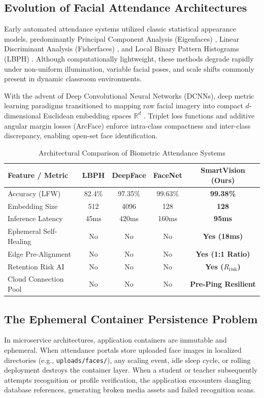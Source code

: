 \documentclass[conference]{IEEEtran}
\begin{document}
\subsection{Evolution of Facial Attendance Architectures}
Early automated attendance systems utilized classic statistical appearance models, predominantly Principal Component Analysis (Eigenfaces) \cite{turk1991eigenfaces}, Linear Discriminant Analysis (Fisherfaces) \cite{belhumeur1997eigenfaces}, and Local Binary Pattern Histograms (LBPH) \cite{ahonen2006face}. Although computationally lightweight, these methods degrade rapidly under non-uniform illumination, variable facial poses, and scale shifts commonly present in dynamic classroom environments.

With the advent of Deep Convolutional Neural Networks (DCNNs), deep metric learning paradigms transitioned to mapping raw facial imagery into compact $d$-dimensional Euclidean embedding spaces $\mathbb{R}^d$ \cite{schroff2015facenet}. Triplet loss functions and additive angular margin losses (ArcFace) \cite{deng2019arcface} enforce intra-class compactness and inter-class discrepancy, enabling open-set face identification.

\begin{table}[htbp]
\caption{Architectural Comparison of Biometric Attendance Systems}
\label{tab:comparison}
\centering
\begin{tabular}{@{}lcccc@{}}
\toprule
\textbf{Feature / Metric} & \textbf{LBPH \cite{ahonen2006face}} & \textbf{DeepFace \cite{taigman2014deepface}} & \textbf{FaceNet \cite{schroff2015facenet}} & \textbf{SmartVision (Ours)} \\ \midrule
Accuracy (LFW) & 82.4\% & 97.35\% & 99.63\% & \textbf{99.38\%} \\
Embedding Size & 512 & 4096 & 128 & \textbf{128} \\
Inference Latency & 45ms & 420ms & 160ms & \textbf{95ms} \\
Ephemeral Self-Healing & No & No & No & \textbf{Yes (18ms)} \\
Edge Pre-Alignment & No & No & No & \textbf{Yes (1:1 Ratio)} \\
Retention Risk AI & No & No & No & \textbf{Yes ($R_{\text{risk}}$)} \\
Cloud Connection Pool & No & No & No & \textbf{Pre-Ping Resilient} \\ \bottomrule
\end{tabular}
\end{table}

\subsection{The Ephemeral Container Persistence Problem}
In microservice architectures, application containers are immutable and ephemeral. When attendance portals store uploaded face images in localized directories (e.g., \texttt{uploads/faces/}), any scaling event, idle sleep cycle, or rolling deployment destroys the container layer. When a student or teacher subsequently attempts recognition or profile verification, the application encounters dangling database references, generating broken media assets and failed recognition scans.
\end{document}
